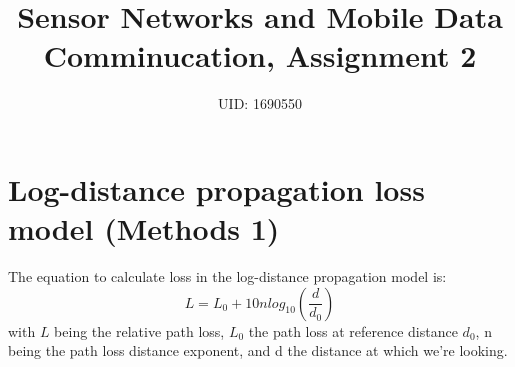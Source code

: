 \documentclass[11pt,journal]{article}
\begin{document}
	\title{Sensor Networks and Mobile Data Comminucation, Assignment 2}
	
	\author{UID: 1690550}%
	



	
	
	\maketitle
	
	
	
	

	\section{Log-distance propagation loss model\cite{log distance doc} (Methods 1)}
	The equation to calculate loss in the log-distance propagation model is:
	\[L = L_0 + 10nlog_{10}(\dfrac{d}{d_0})\] 
	with $L$ being the relative path loss, $L_0$ the path loss at reference distance $d_0$, n being the path loss distance exponent, and d the distance at which we're looking.
	
\end{document}
